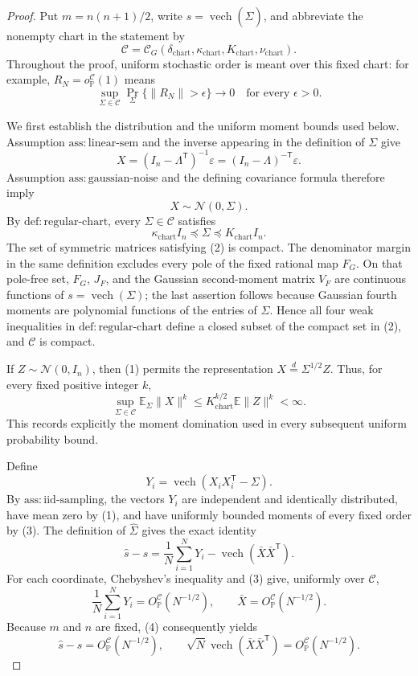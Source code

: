 \documentclass{article}
\begin{document}
\begin{proof}
Put \(m=n(n+1)/2\), write \(\widehat s=\operatorname{vech}(\widehat\Sigma)\), and abbreviate the nonempty chart in the statement by
\[
 \mathcal C=\mathcal C_G(\delta_{\mathrm{chart}},\kappa_{\mathrm{chart}},K_{\mathrm{chart}},\nu_{\mathrm{chart}}).
\]
Throughout the proof, uniform stochastic order is meant over this fixed chart: for example, \(R_N=o_{\mathbb P}^{\mathcal C}(1)\) means
\[
 \sup_{\Sigma\in\mathcal C}\Pr_{\Sigma}\{\lVert R_N\rVert>\epsilon\}\longrightarrow0
 \quad\text{for every }\epsilon>0.
\]

We first establish the distribution and the uniform moment bounds used below.  Assumption \(\mathrm{ass:linear\mbox{-}sem}\) and the inverse appearing in the definition of \(\Sigma\) give
\[
 X=(I_n-\Lambda^{\mathsf T})^{-1}\varepsilon
   =(I_n-\Lambda)^{-\mathsf T}\varepsilon.
\]
Assumption \(\mathrm{ass:gaussian\mbox{-}noise}\) and the defining covariance formula therefore imply
\[
 X\sim\mathcal N(0,\Sigma).
\tag{1}
\]
By \(\mathrm{def:regular\mbox{-}chart}\), every \(\Sigma\in\mathcal C\) satisfies
\[
 \kappa_{\mathrm{chart}}I_n\preceq\Sigma\preceq K_{\mathrm{chart}}I_n.
\tag{2}
\]
The set of symmetric matrices satisfying (2) is compact.  The denominator margin in the same definition excludes every pole of the fixed rational map \(F_G\).  On that pole-free set, \(F_G\), \(J_F\), and the Gaussian second-moment matrix \(V_F\) are continuous functions of \(s=\operatorname{vech}(\Sigma)\); the last assertion follows because Gaussian fourth moments are polynomial functions of the entries of \(\Sigma\).  Hence all four weak inequalities in \(\mathrm{def:regular\mbox{-}chart}\) define a closed subset of the compact set in (2), and \(\mathcal C\) is compact.

If \(Z\sim\mathcal N(0,I_n)\), then (1) permits the representation \(X\overset{d}=\Sigma^{1/2}Z\).  Thus, for every fixed positive integer \(k\),
\[
 \sup_{\Sigma\in\mathcal C}\mathbb E_{\Sigma}\lVert X\rVert^k
 \le K_{\mathrm{chart}}^{k/2}\mathbb E\lVert Z\rVert^k<\infty.
\tag{3}
\]
This records explicitly the moment domination used in every subsequent uniform probability bound.

Define
\[
 Y_i=\operatorname{vech}(X_iX_i^{\mathsf T}-\Sigma).
\]
By \(\mathrm{ass:iid\mbox{-}sampling}\), the vectors \(Y_i\) are independent and identically distributed, have mean zero by (1), and have uniformly bounded moments of every fixed order by (3).  The definition of \(\widehat\Sigma\) gives the exact identity
\[
 \widehat s-s
 =\frac1N\sum_{i=1}^N Y_i
  -\operatorname{vech}(\bar X\bar X^{\mathsf T}).
\tag{4}
\]
For each coordinate, Chebyshev's inequality and (3) give, uniformly over \(\mathcal C\),
\[
 \frac1N\sum_{i=1}^N Y_i=O_{\mathbb P}^{\mathcal C}(N^{-1/2}),
 \qquad
 \bar X=O_{\mathbb P}^{\mathcal C}(N^{-1/2}).
\]
Because \(m\) and \(n\) are fixed, (4) consequently yields
\[
 \widehat s-s=O_{\mathbb P}^{\mathcal C}(N^{-1/2}),
 \qquad
 \sqrt N\operatorname{vech}(\bar X\bar X^{\mathsf T})
 =O_{\mathbb P}^{\mathcal C}(N^{-1/2}).
\tag{5}
\]


\end{proof}
\end{document}
